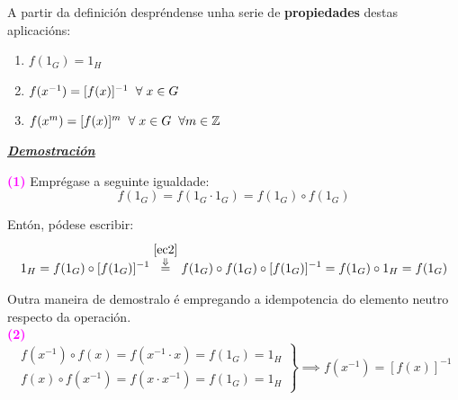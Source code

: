 \documentclass[twoside]{report}
\newcommand{\magbf}[1]{\textcolor{magenta}{\textbf{#1}}} %
\theoremstyle{mystyle}
\begin{document}
\begin{center}
\end{center}

\vspace{3mm}

\noindent A partir da definición despréndense unha serie de \textbf{propiedades} destas aplicacións: 

\begin{enumerate}
    \item $f(1_{G}) = 1_{H}$
    \item $f(x^{-1}) = [f(x)]^{-1} \hspace{2mm} \forall \hspace{1mm} x \in G$
    \item $f(x^{m}) = [f(x)]^{m} \hspace{2mm} \forall \hspace{1mm} x \in G \hspace{2mm} \forall m \in \mathbb{Z}$
\end{enumerate}

\vspace{2mm}

\noindent \textbf{\textit{\underline{Demostración}}}

\vspace{2mm}

\noindent \magbf{(1)} Emprégase a seguinte igualdade:\\ 
\begin{equation}\label{ec2}
    f(1_{G}) = f(1_{G} \cdot 1_{G}) = f(1_{G}) \circ f(1_{G})
\end{equation}

Entón, pódese escribir:
$$1_{H} = f(1_{G}) \circ [f(1_{G})]^{-1} \overset{\overset{\eqref{ec2}}{\Downarrow}}{=} f(1_{G}) \circ f(1_{G}) \circ [f(1_{G})]^{-1} = f(1_{G}) \circ 1_{H} = f(1_{G})$$

\vspace{2mm}

Outra maneira de demostralo é empregando a idempotencia do elemento neutro respecto da operación.\\


\noindent \magbf{(2)}
\[ 
\left. \begin{array}{r} 
f(x^{-1}) \circ f(x) = f(x^{-1} \cdot x) = f(1_{G}) = 1_{H}\\[1ex]
f(x) \circ f(x^{-1}) = f(x \cdot x^{-1}) = f(1_{G}) = 1_{H}
\end{array} \right\} 
\implies f(x^{-1}) = [f(x)]^{-1}
\]
\end{document}
